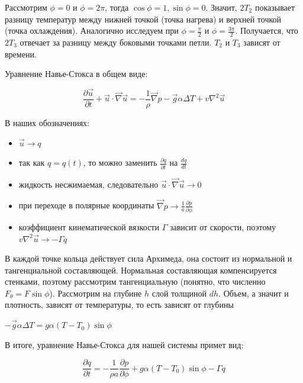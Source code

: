 \documentclass[12pt]{article}
\begin{document}
Рассмотрим $\phi = 0$ и $\phi = 2 \pi$, тогда $\cos\phi = 1, \sin\phi = 0$. Значит, $2T_2$ показывает разницу температур между нижней точкой (точка нагрева) и верхней точкой (точка охлаждения). Аналогично исследуем при $\phi = \frac{\pi}{2}$ и $\phi = \frac{3 \pi}{2}$. Получается, что $2T_3$ отвечает за разницу между боковыми точками петли. $T_2$ и $T_3$ зависят от времени.

Уравнение Навье-Стокса в общем виде:

\begin{equation*}
\frac{\partial \overrightarrow{u}}{\partial t} + \overrightarrow{u} \cdot \overrightarrow{\nabla} \overrightarrow{u} = -\frac{1}{\rho} \overrightarrow{\nabla} p - \overrightarrow{g} \alpha \Delta T + v \nabla^2 \overrightarrow{u}
\end{equation*}

В наших обозначениях:
\begin{itemize}
\item $\overrightarrow{u} \rightarrow q$
\item так как $q=q(t)$, то можно заменить $\frac{\partial q}{\partial t}$ на $\frac{dq}{dt}$
\item жидкость несжимаемая, следовательно $\overrightarrow{u} \cdot \overrightarrow{\nabla} \overrightarrow{u} \rightarrow 0$
\item при переходе в полярные координаты $\overrightarrow{\nabla} p \rightarrow \frac{1}{a} \frac{\partial p}{\partial \phi}$
\item коэффициент кинематической вязкости $\Gamma$ зависит от скорости, поэтому $v \nabla^2 \overrightarrow{u} \rightarrow -\Gamma q$
\end{itemize}


В каждой точке кольца действует сила Архимеда, она состоит из нормальной и тангенциальной составляющей. Нормальная составляющая компенсируется стенками, поэтому рассмотрим тангенциальную (понятно, что численно $F_{\theta} = F\sin\phi$). Рассмотрим на глубине $h$ слой толщиной $dh$. Объем, а значит и плотность, зависят от температуры, то есть зависят от глубины 

$-\overrightarrow{g} \alpha \Delta T = g \alpha (T-T_0) \sin\phi$

В итоге, уравнение Навье-Стокса для нашей системы примет вид:

\begin{equation}\label{eq2}
\frac{\partial q}{\partial t} = -\frac{1}{\rho a}\frac{\partial p}{\partial \phi} + g \alpha (T-T_0) \sin\phi -\Gamma q
\end{equation}
\end{document}
